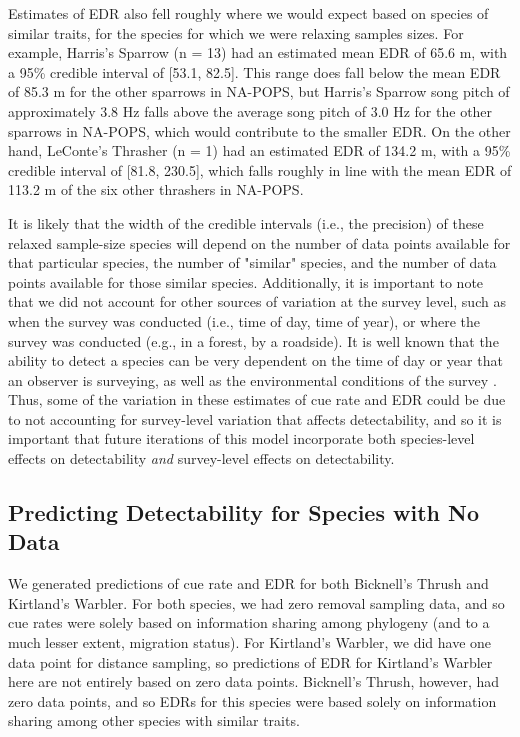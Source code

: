 \documentclass[12pt]{article}
\begin{document}
\par Estimates of EDR also fell roughly where we would expect based on species of similar traits, for the species for which we were relaxing samples sizes.
For example, Harris's Sparrow (n = 13) had an estimated mean EDR of 65.6 m, with a 95\% credible interval of [53.1, 82.5].
This range does fall below the mean EDR of 85.3 m for the other sparrows in NA-POPS, but Harris's Sparrow song pitch of approximately 3.8 Hz falls above the average song pitch of 3.0 Hz for the other sparrows in NA-POPS, which would contribute to the smaller EDR.
On the other hand, LeConte's Thrasher (n = 1) had an estimated EDR of 134.2 m, with a 95\% credible interval of [81.8, 230.5], which falls roughly in line with the mean EDR of 113.2 m of the six other thrashers in NA-POPS.

\par It is likely that the width of the credible intervals (i.e., the precision) of these relaxed sample-size species will depend on the number of data points available for that particular species, the number of "similar" species, and the number of data points available for those similar species.
Additionally, it is important to note that we did not account for other sources of variation at the survey level, such as when the survey was conducted (i.e., time of day, time of year), or where the survey was conducted (e.g., in a forest, by a roadside).
It is well known that the ability to detect a species can be very dependent on the time of day or year that an observer is surveying, as well as the environmental conditions of the survey \citep{edwards_point_2023}.
Thus, some of the variation in these estimates of cue rate and EDR could be due to not accounting for survey-level variation that affects detectability, and so it is important that future iterations of this model incorporate both species-level effects on detectability \textit{and} survey-level effects on detectability.

\subsection{Predicting Detectability for Species with No Data}

\par We generated predictions of cue rate and EDR for both Bicknell’s Thrush and Kirtland’s Warbler.
For both species, we had zero removal sampling data, and so cue rates were solely based on information sharing among phylogeny (and to a much lesser extent, migration status). 
For Kirtland’s Warbler, we did have one data point for distance sampling, so predictions of EDR for Kirtland’s Warbler here are not entirely based on zero data points.
Bicknell’s Thrush, however, had zero data points, and so EDRs for this species were based solely on information sharing among other species with similar traits.
\end{document}
